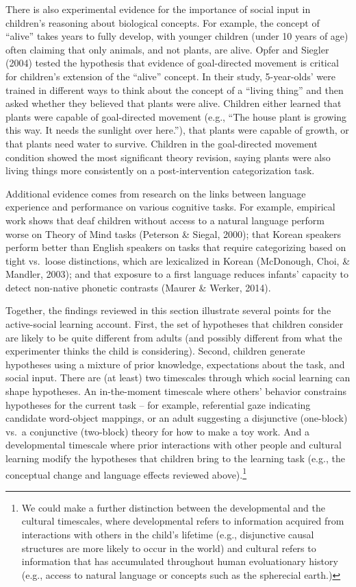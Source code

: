 \documentclass[english,floatsintext,man]{apa6}
\theoremstyle{definition}
\theoremstyle{definition}
\theoremstyle{definition}
\theoremstyle{remark}
\begin{document}
There is also experimental evidence for the importance of social input
in children's reasoning about biological concepts. For example, the
concept of \enquote{alive} takes years to fully develop, with younger
children (under 10 years of age) often claiming that only animals, and
not plants, are alive. Opfer and Siegler (2004) tested the hypothesis
that evidence of goal-directed movement is critical for children's
extension of the \enquote{alive} concept. In their study, 5-year-olds'
were trained in different ways to think about the concept of a
\enquote{living thing} and then asked whether they believed that plants
were alive. Children either learned that plants were capable of
goal-directed movement (e.g., \enquote{The house plant is growing this
way. It needs the sunlight over here.}), that plants were capable of
growth, or that plants need water to survive. Children in the
goal-directed movement condition showed the most significant theory
revision, saying plants were also living things more consistently on a
post-intervention categorization task.

Additional evidence comes from research on the links between language
experience and performance on various cognitive tasks. For example,
empirical work shows that deaf children without access to a natural
language perform worse on Theory of Mind tasks (Peterson \& Siegal,
2000); that Korean speakers perform better than English speakers on
tasks that require categorizing based on tight vs.~loose distinctions,
which are lexicalized in Korean (McDonough, Choi, \& Mandler, 2003); and
that exposure to a first language reduces infants' capacity to detect
non-native phonetic contrasts (Maurer \& Werker, 2014).

Together, the findings reviewed in this section illustrate several
points for the active-social learning account. First, the set of
hypotheses that children consider are likely to be quite different from
adults (and possibly different from what the experimenter thinks the
child is considering). Second, children generate hypotheses using a
mixture of prior knowledge, expectations about the task, and social
input. There are (at least) two timescales through which social learning
can shape hypotheses. An in-the-moment timescale where others' behavior
constrains hypotheses for the current task -- for example, referential
gaze indicating candidate word-object mappings, or an adult suggesting a
disjunctive (one-block) vs.~a conjunctive (two-block) theory for how to
make a toy work. And a developmental timescale where prior interactions
with other people and cultural learning modify the hypotheses that
children bring to the learning task (e.g., the conceptual change and
language effects reviewed above).\footnote{We could make a further
  distinction between the developmental and the cultural timescales,
  where developmental refers to information acquired from interactions
  with others in the child's lifetime (e.g., disjunctive causal
  structures are more likely to occur in the world) and cultural refers
  to information that has accumulated throughout human evoluationary
  history (e.g., access to natural language or concepts such as the
  spherecial earth.)}
\end{document}
